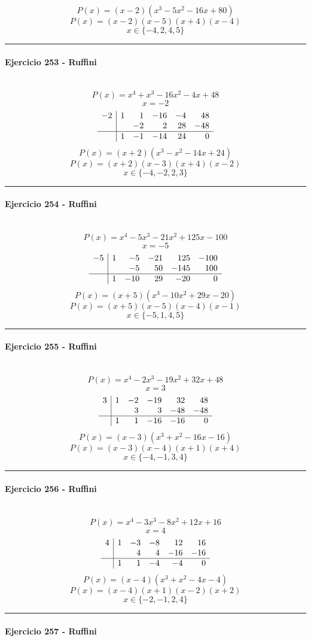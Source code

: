 \documentclass[10pt,a4paper]{article}
\newcommand{\res}[1]{\paragraph{#1}\mbox{}\\[-1.2em]}
\begin{document}
\[ P(x)=(x-2)(x^{3} - 5 x^{2} - 16 x + 80) \]
\[ P(x)=(x-2)(x-5)(x+4)(x-4) \]
\[ \boxed{x\in\{-4,2,4,5\}} \]
\vspace{1mm}\hrule\vspace{2mm}
\res{Ejercicio 253 - Ruffini}
\[ P(x)=x^{4} + x^{3} - 16 x^{2} - 4 x + 48 \]
\[ x=-2 \]
\[\begin{array}{r|rrrrr}-2 & 1 & 1 & -16 & -4 & 48\\  &  & -2 & 2 & 28 & -48\\\hline  & 1 & -1 & -14 & 24 & 0\end{array}\]
\[ P(x)=(x+2)(x^{3} - x^{2} - 14 x + 24) \]
\[ P(x)=(x+2)(x-3)(x+4)(x-2) \]
\[ \boxed{x\in\{-4,-2,2,3\}} \]
\vspace{1mm}\hrule\vspace{2mm}
\res{Ejercicio 254 - Ruffini}
\[ P(x)=x^{4} - 5 x^{3} - 21 x^{2} + 125 x - 100 \]
\[ x=-5 \]
\[\begin{array}{r|rrrrr}-5 & 1 & -5 & -21 & 125 & -100\\  &  & -5 & 50 & -145 & 100\\\hline  & 1 & -10 & 29 & -20 & 0\end{array}\]
\[ P(x)=(x+5)(x^{3} - 10 x^{2} + 29 x - 20) \]
\[ P(x)=(x+5)(x-5)(x-4)(x-1) \]
\[ \boxed{x\in\{-5,1,4,5\}} \]
\vspace{1mm}\hrule\vspace{2mm}
\res{Ejercicio 255 - Ruffini}
\[ P(x)=x^{4} - 2 x^{3} - 19 x^{2} + 32 x + 48 \]
\[ x=3 \]
\[\begin{array}{r|rrrrr}3 & 1 & -2 & -19 & 32 & 48\\  &  & 3 & 3 & -48 & -48\\\hline  & 1 & 1 & -16 & -16 & 0\end{array}\]
\[ P(x)=(x-3)(x^{3} + x^{2} - 16 x - 16) \]
\[ P(x)=(x-3)(x-4)(x+1)(x+4) \]
\[ \boxed{x\in\{-4,-1,3,4\}} \]
\vspace{1mm}\hrule\vspace{2mm}
\res{Ejercicio 256 - Ruffini}
\[ P(x)=x^{4} - 3 x^{3} - 8 x^{2} + 12 x + 16 \]
\[ x=4 \]
\[\begin{array}{r|rrrrr}4 & 1 & -3 & -8 & 12 & 16\\  &  & 4 & 4 & -16 & -16\\\hline  & 1 & 1 & -4 & -4 & 0\end{array}\]
\[ P(x)=(x-4)(x^{3} + x^{2} - 4 x - 4) \]
\[ P(x)=(x-4)(x+1)(x-2)(x+2) \]
\[ \boxed{x\in\{-2,-1,2,4\}} \]
\vspace{1mm}\hrule\vspace{2mm}
\res{Ejercicio 257 - Ruffini}
\end{document}
